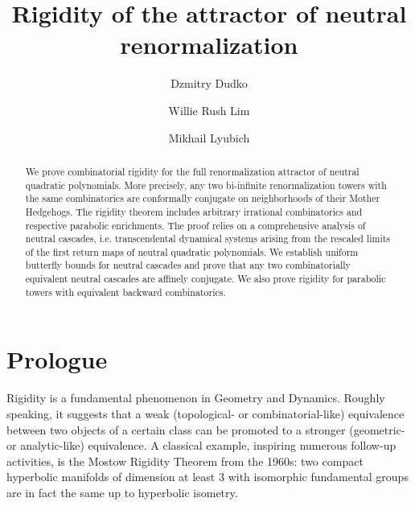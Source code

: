 \documentclass{amsart}
\title[Rigidity of the attractor of neutral renormalization]{Rigidity of the attractor of neutral renormalization}
\author{Dzmitry Dudko}
\author{Willie Rush Lim}
\author{Mikhail Lyubich}
\date{}
\begin{document}
\begin{abstract}
    We prove combinatorial rigidity for the full renormalization attractor of neutral quadratic polynomials. 
    More precisely, any two bi-infinite renormalization towers with the same combinatorics are conformally conjugate on neighborhoods of their Mother Hedgehogs.
    The rigidity theorem includes arbitrary irrational combinatorics and respective parabolic enrichments. The proof relies on a comprehensive analysis of neutral cascades, i.e. transcendental dynamical systems arising from the rescaled limits of the first return maps of neutral quadratic polynomials. 
    We establish uniform butterfly bounds for neutral cascades and prove that any two combinatorially equivalent neutral cascades are affinely conjugate.
    We also prove rigidity for parabolic towers with equivalent backward combinatorics.
\end{abstract}



\maketitle

\setcounter{tocdepth}{1}
\tableofcontents

\begingroup
\renewcommand{\addcontentsline}[3]{}


\setcounter{equation}{0}
\renewcommand{\theequation}{\arabic{equation}}

\section*{Prologue}

Rigidity is a fundamental phenomenon in Geometry and Dynamics.
Roughly speaking, it suggests that a weak (topological- or combinatorial-like) equivalence between two objects of a certain class can be promoted to a stronger  (geometric- or analytic-like) equivalence. A classical example, inspiring
numerous follow-up activities, is the Mostow Rigidity Theorem from the 1960s: 
two compact hyperbolic manifolds of dimension at least $3$ with isomorphic fundamental groups are in fact the same up to hyperbolic isometry. 
\end{document}
